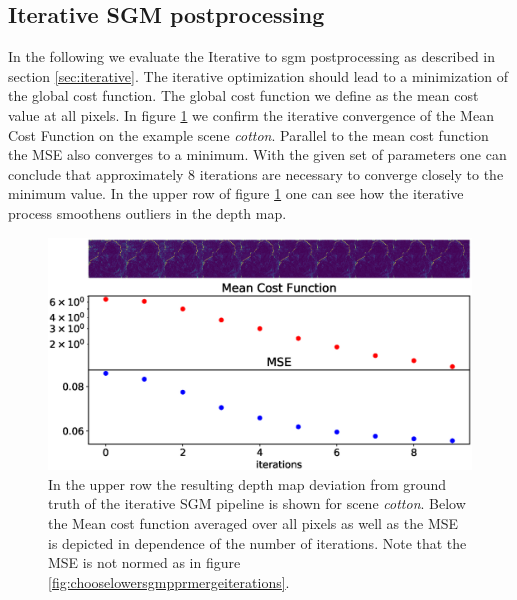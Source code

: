 \documentclass  [
  paper    = a4,
  BCOR     = 10mm,
  twoside,
  fontsize = 12pt,
  fleqn,
  toc      = bibnumbered,
  toc      = listofnumbered,
  numbers  = noendperiod,
  headings = normal,
  listof   = leveldown,
  version  = 3.03
]                                       {scrreprt}
\begin{document}
\subsection{Iterative SGM postprocessing}
In the following we evaluate the Iterative to sgm postprocessing as described in section \ref{sec:iterative}. The iterative optimization should lead to a minimization of the global cost function. The global cost function we define as the mean cost value at all pixels. In figure \ref{fig:iterationcostcotton} we confirm the iterative convergence of the Mean Cost Function on the example scene \textit{cotton}. Parallel to the mean cost function the MSE also converges to a minimum. With the given set of parameters one can conclude that approximately 8 iterations are necessary to converge closely to the minimum value. In the upper row of figure \ref{fig:iterationcostcotton} one can see how the iterative process smoothens outliers in the depth map.\\
\begin{figure}
	\centering
	\includegraphics[width=1\linewidth]{images/iteration_cost_cotton}
	\caption[Iterative Improvement of scene \textit{cotton}]{In the upper row the resulting depth map deviation from ground truth of the iterative SGM pipeline is shown for scene \textit{cotton}. Below the Mean cost function averaged over all pixels as well as the MSE is depicted in dependence of the number of iterations. Note that the MSE is not normed as in figure \ref{fig:chooselowersgmpprmergeiterations}.}
	\label{fig:iterationcostcotton}
\end{figure}
\end{document}
